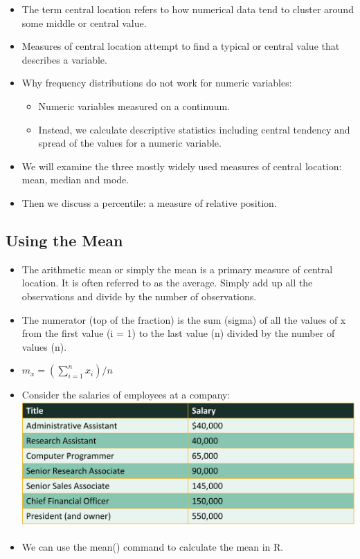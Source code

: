 \documentclass[
  letterpaper,
  DIV=11,
  numbers=noendperiod]{scrreprt}
\providecommand{\tightlist}{%
  \setlength{\itemsep}{0pt}\setlength{\parskip}{0pt}}\usepackage{longtable,booktabs,array}
\begin{document}
\begin{itemize}
\tightlist
\item
  The term central location refers to how numerical data tend to cluster
  around some middle or central value.
\item
  Measures of central location attempt to find a typical or central
  value that describes a variable.
\item
  Why frequency distributions do not work for numeric variables:

  \begin{itemize}
  \tightlist
  \item
    Numeric variables measured on a continuum.
  \item
    Instead, we calculate descriptive statistics including central
    tendency and spread of the values for a numeric variable.
  \end{itemize}
\item
  We will examine the three mostly widely used measures of central
  location: mean, median and mode.
\item
  Then we discuss a percentile: a measure of relative position.
\end{itemize}

\subsection{Using the Mean}\label{using-the-mean}

\begin{itemize}
\item
  The arithmetic mean or simply the mean is a primary measure of central
  location. It is often referred to as the average. Simply add up all
  the observations and divide by the number of observations.
\item
  The numerator (top of the fraction) is the sum (sigma) of all the
  values of x from the first value (i = 1) to the last value (n) divided
  by the number of values (n).
\item
  \(m_x = (\sum_{i=1}^{n} x_{i})/n\)
\item
  Consider the salaries of employees at a company:
  \includegraphics{Pictures/Ch2/Salaries.png}
\item
  We can use the mean() command to calculate the mean in R.
\end{itemize}
\end{document}
